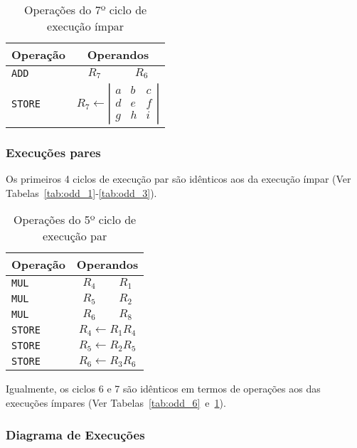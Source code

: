 \begin{multicols}{2}
\begin{table}[H]
\centering
\begin{tabular}{l|c|c}
Operação & \multicolumn{2}{c}{Operandos} \\
\hline
\texttt{ADD} & $R_7$ & $R_6$ \\
\hline
\texttt{STORE} &\multicolumn{2}{c}{$R_7\leftarrow \left|\begin{matrix}a&b&c\\d&e&f\\g&h&i\end{matrix}\right|$} \\
\end{tabular}
\caption{Operações do 7º ciclo de execução ímpar}
\label{tab:odd_7}
\end{table}

\subsubsection{Execuções pares}

Os primeiros 4 ciclos de execução par são idênticos aos da execução ímpar (Ver Tabelas~\ref{tab:odd_1}-\ref{tab:odd_3}).

\begin{table}[H]
\centering
\begin{tabular}{l|c|c}
Operação & \multicolumn{2}{c}{Operandos} \\
\hline
\texttt{MUL} & $R_4$ & $R_1$ \\
\texttt{MUL} & $R_5$ & $R_2$ \\
\texttt{MUL} & $R_6$ & $R_8$ \\
\hline
\texttt{STORE} & \multicolumn{2}{c}{$R_4\leftarrow R_1R_4$} \\
\texttt{STORE} & \multicolumn{2}{c}{$R_5\leftarrow R_2R_5$} \\
\texttt{STORE} & \multicolumn{2}{c}{$R_6\leftarrow R_3R_6$} \\
\end{tabular}
\caption{Operações do 5º ciclo de execução par}
\label{tab:even_5}
\end{table}

Igualmente, os ciclos 6 e 7 são idênticos em termos de operações aos das execuções ímpares (Ver Tabelas~\ref{tab:odd_6}~e~\ref{tab:odd_7}).

\end{multicols}

\subsubsection{Diagrama de Execuções}

